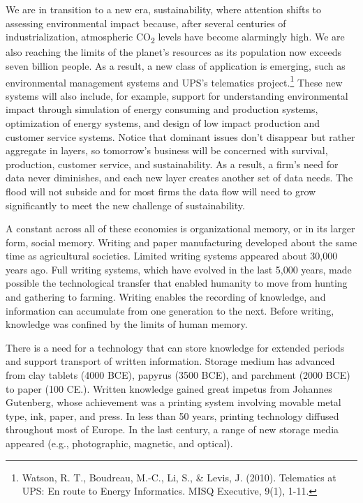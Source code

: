 \documentclass[
]{article}
\begin{document}
We are in transition to a new era, sustainability, where attention
shifts to assessing environmental impact because, after several
centuries of industrialization, atmospheric CO\textsubscript{2} levels have become
alarmingly high. We are also reaching the limits of the planet's
resources as its population now exceeds seven billion people. As a
result, a new class of application is emerging, such as environmental
management systems and UPS's telematics project.\footnote{Watson, R. T., Boudreau, M.-C., Li, S., \& Levis, J. (2010).
  Telematics at UPS: En route to Energy Informatics. MISQ Executive,
  9(1), 1-11.} These new systems
will also include, for example, support for understanding environmental
impact through simulation of energy consuming and production systems,
optimization of energy systems, and design of low impact production and
customer service systems. Notice that dominant issues don't disappear
but rather aggregate in layers, so tomorrow's business will be concerned
with survival, production, customer service, and sustainability. As a
result, a firm's need for data never diminishes, and each new layer
creates another set of data needs. The flood will not subside and for
most firms the data flow will need to grow significantly to meet the new
challenge of sustainability.

A constant across all of these economies is organizational memory, or in
its larger form, social memory. Writing and paper manufacturing
developed about the same time as agricultural societies. Limited writing
systems appeared about 30,000 years ago. Full writing systems, which
have evolved in the last 5,000 years, made possible the technological
transfer that enabled humanity to move from hunting and gathering to
farming. Writing enables the recording of knowledge, and information can
accumulate from one generation to the next. Before writing, knowledge
was confined by the limits of human memory.

There is a need for a technology that can store knowledge for extended
periods and support transport of written information. Storage medium has
advanced from clay tablets (4000 BCE), papyrus (3500 BCE), and parchment
(2000 BCE) to paper (100 CE.). Written knowledge gained great impetus
from Johannes Gutenberg, whose achievement was a printing system
involving movable metal type, ink, paper, and press. In less than 50
years, printing technology diffused throughout most of Europe. In the
last century, a range of new storage media appeared (e.g., photographic,
magnetic, and optical).
\end{document}
